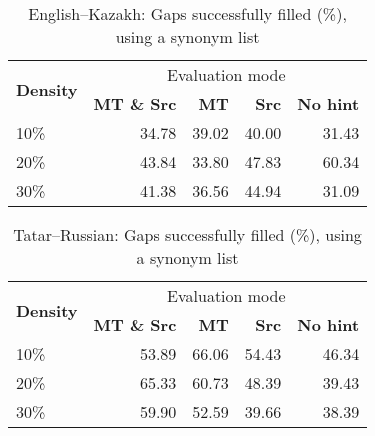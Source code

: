 \documentclass[11pt]{article}
\begin{document}
\begin{table}
  \begin{tabular}{|l|r|r|r|r|}
    \hline
    \multirow{2}{*}{\textbf{Density}} & \multicolumn{4}{|c|}{Evaluation mode} \\\cline{2-5}
                                            & \textbf{MT \& Src} & \textbf{MT} & \textbf{Src} & \textbf{No hint} \\
    10\%                                    & 34.78              & 39.02       & 40.00        & 31.43        \\
    20\%                                    & 43.84              & 33.80       & 47.83        & 60.34        \\
    30\%                                    & 41.38              & 36.56       & 44.94        & 31.09        \\
    \hline
  \end{tabular}
  \caption{English--Kazakh: Gaps successfully filled (\%), using a synonym list}
  \label{table:res-eng-kaz}
\end{table}

\begin{table}
  \begin{tabular}{|l|r|r|r|r|}
    \hline
    \multirow{2}{*}{\textbf{Density}} & \multicolumn{4}{|c|}{Evaluation mode} \\\cline{2-5}
                                            & \textbf{MT \& Src} & \textbf{MT} & \textbf{Src} & \textbf{No hint} \\
    10\%                                    & 53.89              & 66.06       & 54.43        & 46.34        \\
    20\%                                    & 65.33              & 60.73       & 48.39        & 39.43        \\
    30\%                                    & 59.90              & 52.59       & 39.66        & 38.39        \\
    \hline
  \end{tabular}
  \caption{Tatar--Russian: Gaps successfully filled (\%), using a synonym list}
  \label{table:res-tat-rus}
\end{table}
\end{document}
